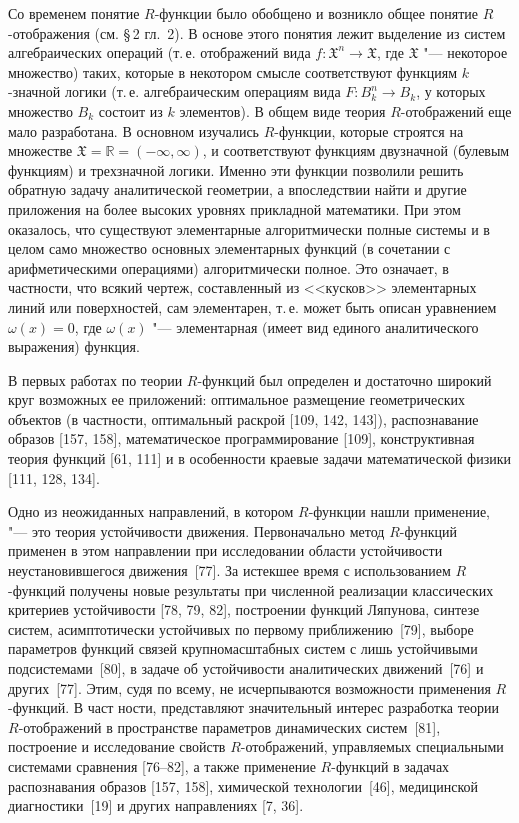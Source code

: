 Со временем понятие $R$-функции было обобщено и возникло общее понятие
$R$-отображения (см. \S\,2 гл.~2). В основе этого понятия лежит выделение из
систем алгебраических операций (т.\,е. отображений вида
$f\colon\mathfrak X^n\to\mathfrak X$, где $\mathfrak X$ "--- некоторое
множество) таких, которые в некотором смысле соответствуют функциям
$k$-значной логики (т.\,е. алгебраическим операциям вида
$F\colon B_k^n\to B_k$, у которых множество $B_k$ состоит из $k$
элементов). В общем виде теория $R$-отображений еще мало разработана.
В основном изучались $R$-функции, которые строятся на множестве
$\mathfrak X=\mathbb R=(-\infty,\infty)$, и соответствуют функциям
двузначной (булевым функциям) и трехзначной логики. Именно эти функции
позволили решить обратную задачу аналитической геометрии, а впоследствии
найти и другие приложения на более высоких уровнях прикладной математики.
При этом оказалось, что существуют элементарные алгоритмически полные
системы и в целом само множество основных элементарных функций (в сочетании
с арифметическими операциями) алгоритмически полное. Это означает,
в частности, что всякий чертеж, составленный из <<кусков>> элементарных
линий или поверхностей, сам элементарен, т.\,е. может быть описан
уравнением $\omega(x)=0$, где $\omega(x)$ "--- элементарная (имеет вид
единого аналитического выражения) функция.

В первых работах по теории $R$-функций был определен и достаточно широкий
круг возможных ее приложений: оптимальное размещение геометрических объектов
(в частности, оптимальный раскрой [109, 142, 143]), распознавание образов
[157, 158], математическое программирование [109], конструктивная теория
функций [61, 111] и в особенности краевые задачи математической физики [111,
128, 134].

Одно из неожиданных направлений, в котором $R$-функции нашли применение,
"--- это теория устойчивости движения. Первоначально метод $R$-функций
применен в этом направлении при исследовании области устойчивости
неустановившегося движения~[77]. За истекшее время с использованием
$R$-функций получены новые результаты при численной реализации классических
критериев устойчивости [78, 79, 82], построении функций Ляпунова, синтезе
систем, асимптотически устойчивых по первому приближению~[79], выборе
параметров функций связей крупномасштабных систем с лишь устойчивыми
подсистемами~[80], в задаче об устойчивости аналитических движений~[76]
и других~[77]. Этим, судя по всему, не исчерпываются возможности применения
$R$-функций. В част\-%
%
ности, представляют значительный интерес разработка теории
$R$-отображений в пространстве параметров динамических систем~[81],
построение и исследование свойств $R$-отображений, управляемых специальными
системами сравнения [76--82], а также применение $R$-функций в задачах
распознавания образов [157, 158], химической технологии~[46], медицинской
диагностики~[19] и других направлениях [7, 36].

